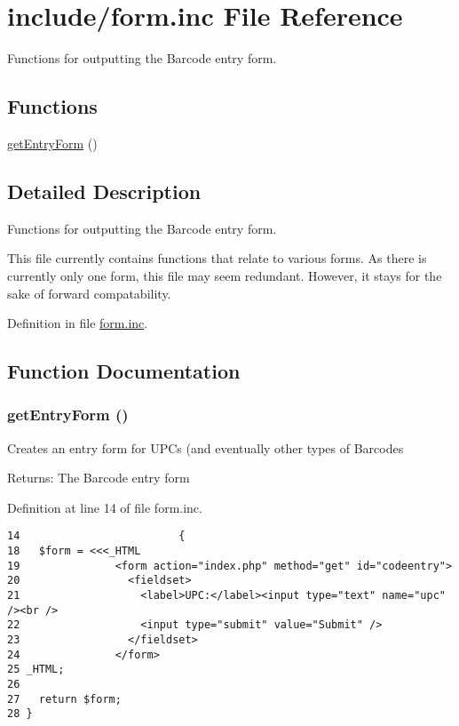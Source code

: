 \hypertarget{form_8inc}{
\section{include/form.inc File Reference}
\label{form_8inc}
}
Functions for outputting the Barcode entry form. 

\subsection*{Functions}
\begin{CompactItemize}
\item 
\hyperlink{form_8inc_839e205cae656bea01ea99e2de94ef1e}{getEntryForm} ()
\end{CompactItemize}


\subsection{Detailed Description}
Functions for outputting the Barcode entry form. 

This file currently contains functions that relate to various forms. As there is currently only one form, this file may seem redundant. However, it stays for the sake of forward compatability. 

Definition in file \hyperlink{form_8inc-source}{form.inc}.

\subsection{Function Documentation}
\hypertarget{form_8inc_839e205cae656bea01ea99e2de94ef1e}{
\subsubsection{\setlength{\rightskip}{0pt plus 5cm}getEntryForm ()}}
\label{form_8inc_839e205cae656bea01ea99e2de94ef1e}


Creates an entry form for UPCs (and eventually other types of Barcodes \begin{Desc}
\item[Returns:]The Barcode entry form \end{Desc}


Definition at line 14 of file form.inc.

\begin{Code}\begin{verbatim}14                         {
18   $form = <<<_HTML
19               <form action="index.php" method="get" id="codeentry">
20                 <fieldset>
21                   <label>UPC:</label><input type="text" name="upc" /><br />
22                   <input type="submit" value="Submit" />
23                 </fieldset>
24               </form>
25 _HTML;
26 
27   return $form;
28 }\end{verbatim}
\end{Code}


